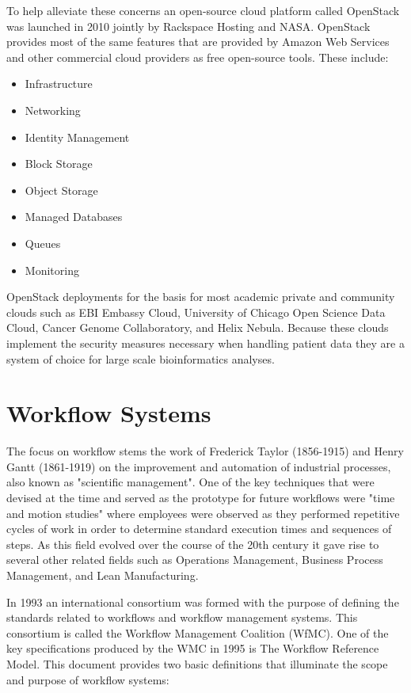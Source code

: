 To help alleviate these concerns an open-source cloud platform called OpenStack was launched in 2010 jointly by Rackspace Hosting and NASA\autocite{sefraoui2012openstack}. OpenStack provides most of the same features that are provided by Amazon Web Services and other commercial cloud providers as free open-source tools. These include:

\begin{itemize}
\item Infrastructure
\item Networking
\item Identity Management
\item Block Storage
\item Object Storage
\item Managed Databases
\item Queues
\item Monitoring
\end{itemize}

OpenStack deployments for the basis for most academic private and community clouds such as EBI Embassy Cloud\autocite{cook2016european}, University of Chicago Open Science Data Cloud\autocite{grossman2010overview}, Cancer Genome Collaboratory\autocite{yung2016icgc}, and Helix Nebula\autocite{marx2013biology}. Because these clouds implement the security measures necessary when handling patient data they are a system of choice for large scale bioinformatics analyses.

\section{Workflow Systems}

The focus on workflow stems the work of Frederick Taylor (1856-1915) and Henry Gantt (1861-1919) on the improvement and automation of industrial processes, also known as "scientific management"\autocite{taylor2004scientific}. One of the key techniques that were devised at the time and served as the prototype for future workflows were "time and motion studies"\autocite{barnes1949motion} where employees were observed as they performed repetitive cycles of work in order to determine standard execution times and sequences of steps. As this field evolved over the course of the 20th century it gave rise to several other related fields such as Operations Management, Business Process Management, and Lean Manufacturing.

In 1993 an international consortium was formed with the purpose of defining the standards related to workflows and workflow management systems. This consortium is called the Workflow Management Coalition (WfMC). One of the key specifications produced by the WMC in 1995 is The Workflow Reference Model\autocite{hollingsworth1995workflow}. This document provides two basic definitions that illuminate the scope and purpose of  workflow systems:

